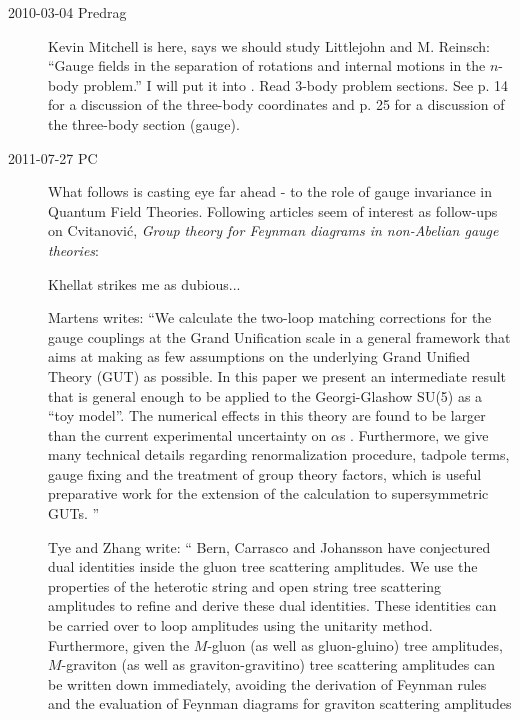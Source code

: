 \begin{description}

\item[2010-03-04 Predrag]
Kevin Mitchell is here, says we should study Littlejohn and
M. Reinsch: ``Gauge fields in the separation of
rotations and internal motions in the $n$-body problem.'' I
will put it into . Read 3-body problem
sections. See p. 14 for a discussion of the three-body
coordinates and p. 25 for a discussion of the three-body
section (gauge).



\item[2011-07-27 PC]
What follows is casting eye far ahead - to the role of gauge invariance
in Quantum Field Theories.
Following articles seem of interest as follow-ups on
Cvitanovi\'c, {\em Group theory for {Feynman} diagrams in
non-{Abelian} gauge theories}:

Khellat strikes me as dubious...

Martens writes: ``We calculate the two-loop matching corrections for the
   gauge couplings at the Grand Unification scale in a general framework
   that aims at making as few assumptions on the underlying Grand Unified
   Theory (GUT) as possible. In this paper we present an intermediate
   result that is general enough to be applied to the Georgi-Glashow
   SU(5) as a ``toy model''. The numerical effects in this theory are
   found to be larger than the current experimental uncertainty on $\alpha$s .
   Furthermore, we give many technical details regarding renormalization
   procedure, tadpole terms, gauge fixing and the treatment of group
   theory factors, which is useful preparative work for the extension of
   the calculation to supersymmetric GUTs.
   ''

Tye and Zhang write: ``
Bern, Carrasco and Johansson have conjectured dual
   identities inside the gluon tree scattering amplitudes.
   We use the properties of the heterotic string and open string tree
   scattering amplitudes to refine and derive these dual identities.
   These identities can be carried over to loop amplitudes using the
   unitarity method. Furthermore, given the $M$-gluon (as well as
   gluon-gluino) tree amplitudes, $M$-graviton (as well as
   graviton-gravitino) tree scattering amplitudes can be written down
   immediately, avoiding the derivation of Feynman rules and the
   evaluation of Feynman diagrams for graviton scattering amplitudes


\end{description}
